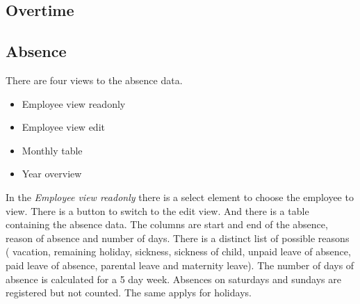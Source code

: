 \subsection{Overtime}
\subsection{Absence}
There are four views to the absence data.
\begin{itemize}
\item Employee view readonly
\item Employee view edit
\item Monthly table
\item Year overview
\end{itemize}
In the \emph{Employee view readonly} there is a select element to choose the employee to view. There is a button to switch to the edit view.
And there is a table containing the absence data. The columns are start and end of the absence, reason of absence and number of days.
There is a distinct list of possible reasons ( vacation,
        remaining holiday,
       sickness,
        sickness of child,
        unpaid leave of absence,
        paid leave of absence,
        parental leave and
        maternity leave).
The number of days of absence is calculated for a 5 day week. Absences on saturdays and sundays are registered but not counted. The same applys for holidays.